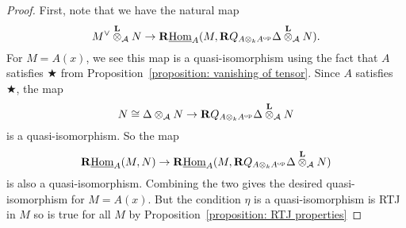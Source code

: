 \begin{proof}
  First, note that we have the natural map 
  \begin{displaymath}
    M^\vee \overset{\mathbf{L}}{\otimes}_{\mathcal A} N \to \mathbf{R}\underline{\operatorname{Hom}}_A(M, \mathbf{R}Q_{A \otimes_k A^{\operatorname{op}}} \Delta \overset{\mathbf{L}}{\otimes}_{\mathcal A} N).
  \end{displaymath}
  For \(M = A(x)\), we see this map is a quasi-isomorphism using the fact that \(A\) satisfies \(\bigstar\) from Proposition~\ref{proposition: vanishing of tensor}. 
  Since \(A\) satisfies \(\bigstar\), the map
  \[N \cong \Delta \otimes_{\mathcal A} N \to
  \mathbf{R}Q_{A \otimes_k A^{\operatorname{op}}} \Delta \overset{\mathbf{L}}{\otimes}_{\mathcal A} N\]
  is a quasi-isomorphism. So the map  
  \begin{displaymath}
    \mathbf{R}\underline{\operatorname{Hom}}_A(M, N) \to \mathbf{R}\underline{\operatorname{Hom}}_A(M, \mathbf{R}Q_{A \otimes_k A^{\operatorname{op}}} \Delta \overset{\mathbf{L}}{\otimes}_{\mathcal A} N)
  \end{displaymath}
  is also a quasi-isomorphism. Combining the two gives the desired quasi-isomorphism for \(M = A(x)\). But the condition \(\eta\) is a quasi-isomorphism is RTJ in \(M\) so is true for all \(M\) by Proposition~\ref{proposition: RTJ properties}
\end{proof}

